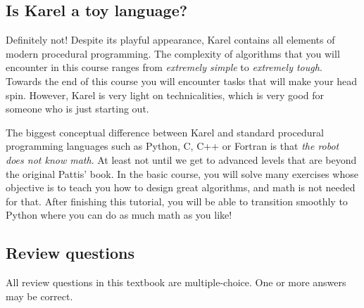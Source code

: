 \subsection{Is Karel a toy language?}

Definitely not! Despite its playful appearance, Karel contains all elements 
of modern procedural programming. The complexity of algorithms 
that you will encounter in this course ranges from {\em extremely simple} 
to {\em extremely tough}. Towards the end of this course you will encounter 
tasks that will make your head spin. However, Karel is very light on 
technicalities, which is very good for someone who is just starting out.

The biggest conceptual difference between Karel and standard procedural
programming languages such as Python, C, C++ or Fortran is that {\em the robot does not 
know math}. At least not until we get to advanced levels that are beyond 
the original Pattis' book. In the basic course, you will solve many exercises 
whose objective is to teach you how to design great algorithms, and math is 
not needed for that. After finishing this tutorial, you will be able to transition 
smoothly to Python where you can do as much math as you like!
 
\subsection{Review questions}

All review questions in this textbook are multiple-choice. One or more 
answers may be correct.

